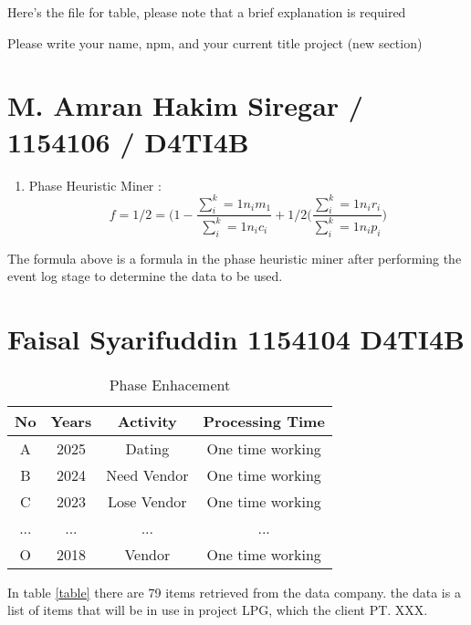 Here's the file for table, please note that a brief explanation is required

Please write your name, npm, and your current title project (new section)



\section{M. Amran Hakim Siregar / 1154106 / D4TI4B}
\begin{enumerate}
    \item Phase Heuristic Miner :
    \begin{equation}
        f=1/2=\bigg(1-\frac{\sum_{i}^{k}= 1 n_{i}m_{1}}{\sum_{i}^{k} = 1 n_{i}c_{i}}\bigg+ 1/2\big(\frac{\sum_{i}^{k}=1 n_{i}r_{i}}{\sum_{i}^{k}= 1 n_{i}p_{i}}\bigg)
    \end{equation}
\end{enumerate}
\par
The formula above is a formula in the phase heuristic miner after performing the event log stage to determine the data to be used.

\section{Faisal Syarifuddin 1154104 D4TI4B}

\begin{center}
    \begin{table}[hhhh]
    \caption{Phase Enhacement}
        \centering
        \begin{tabular}{cccc}
        \hline No & Years & Activity & Processing Time\\
        \hline
            A & 2025 & Dating & One time working  \\
            B & 2024 & Need Vendor & One time working  \\
            C & 2023 & Lose Vendor & One time working  \\
            ... & ... & ... & ...  \\
            O & 2018 & Vendor & One time working  \\
        \hline
        \end{tabular}
    \end{table}
\end{center}

\par In table \ref{table} there are 79 items retrieved from the data company. the data is a list of items that will be in use in project LPG, which the client PT. XXX.

